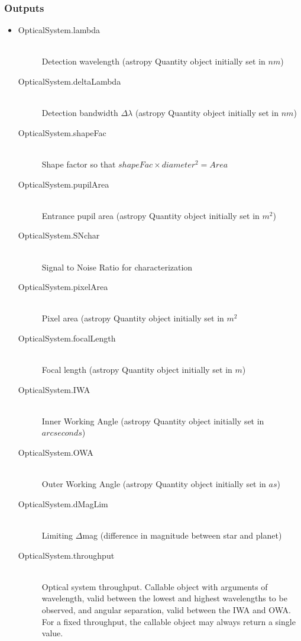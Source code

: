 \documentclass[cleanfoot]{asme2ej}
\begin{document}
\subsubsection*{Outputs}
\begin{itemize}
    \item 
    \begin{description}
        \item[OpticalSystem.lambda] \hfill \\
        Detection wavelength (astropy Quantity object initially set in $ nm $)
        \item[OpticalSystem.deltaLambda] \hfill \\
        Detection bandwidth $ \Delta\lambda $ (astropy Quantity object initially set in $ nm $)
        \item[OpticalSystem.shapeFac] \hfill \\
        Shape factor so that $ shapeFac \times diameter^2 = Area $
        \item[OpticalSystem.pupilArea] \hfill \\
        Entrance pupil area (astropy Quantity object initially set in $ m^{2} $)
        \item[OpticalSystem.SNchar] \hfill \\
        Signal to Noise Ratio for characterization
        \item[OpticalSystem.pixelArea] \hfill \\
        Pixel area (astropy Quantity object initially set in $ m^{2} $
        \item[OpticalSystem.focalLength] \hfill \\
        Focal length (astropy Quantity object initially set in $ m $)
        \item[OpticalSystem.IWA] \hfill \\
        Inner Working Angle (astropy Quantity object initially set in $ arcseconds $)
        \item[OpticalSystem.OWA] \hfill \\
        Outer Working Angle (astropy Quantity object initially set in $ as $)
        \item[OpticalSystem.dMagLim] \hfill \\
        Limiting $ \Delta$mag (difference in magnitude between star and planet)
        \item[OpticalSystem.throughput] \hfill \\
        Optical system throughput. Callable object with arguments of wavelength, valid between the lowest and highest wavelengths to be observed, and angular separation, valid between the IWA and OWA.  For a fixed throughput, the callable object may always return a single value.  

\end{description}
\end{itemize}
\end{document}
